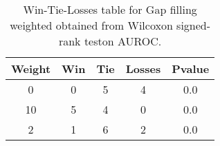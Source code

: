 \begin{table}[H]
\centering
\begin{tabular}{|c|c|c|c|c|}

\textbf{Weight} &  \textbf{Win} &  \textbf{Tie} &  \textbf{Losses} &  \textbf{Pvalue} \\
\hline

              0 &             0 &             5 &                4 &              0.0 \\
\hline
             10 &             5 &             4 &                0 &              0.0 \\
\hline
              2 &             1 &             6 &                2 &              0.0 \\
\hline

\end{tabular}
\caption{Win-Tie-Losses table for Gap filling weighted obtained from Wilcoxon signed-rank teston AUROC.}
\label{tab:gap_filling_weighted_weighted_cae_comparison}
\end{table}